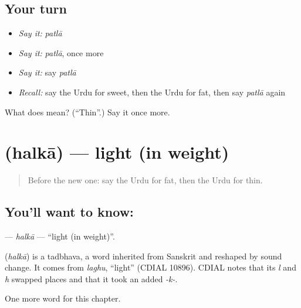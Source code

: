 \subsection*{Your turn}
\begin{itemize}
\raggedright
  \item \emph{Say it:} \emph{patlā}
  \item \emph{Say it:} \emph{patlā}, once more
  \item \emph{Say it:} say \emph{patlā}
  \item \emph{Recall:} say the Urdu for sweet, then the Urdu for fat, then say \emph{patlā} again
\end{itemize}

\begin{tcolorbox}[breakable,colback=teal!4,colframe=teal!35!black,title={Before you move on}]
What does  mean? (\textquotedblleft{}Thin\textquotedblright{}.) Say it once more.
\end{tcolorbox}
\section[\texorpdfstring{\ur{ہلکا} (halkā)}{ہلکا (halkā)}]{ (halkā) — light (in weight)}

\label{lesson:UR-C73-halka}



\begin{quote}
Before the new one: say the Urdu for fat, then the Urdu for thin.
\end{quote}

\subsection*{You'll want to know: }
\textbf{} — \emph{halkā} — \textquotedblleft{}light (in weight)\textquotedblright{}.

\begin{cousinweb}
\textbf{} (\emph{halkā}) is a tadbhava, a word inherited from Sanskrit and reshaped by sound change. It comes from \emph{laghu}, \textquotedblleft{}light\textquotedblright{} (CDIAL 10896). CDIAL notes that its \emph{l} and \emph{h} swapped places and that it took an added \emph{-k-}.
\end{cousinweb}

\begin{grammarlens}[title={What you've built}]
One more word for this chapter.
\end{grammarlens}

